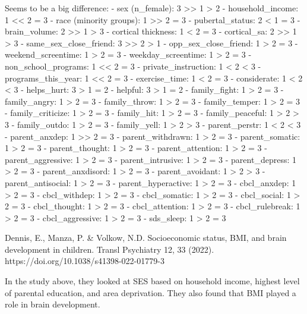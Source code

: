 \documentclass[
  letterpaper,
  DIV=11,
  numbers=noendperiod]{scrreprt}
\begin{document}
Seems to be a big difference: - sex (n\_female): 3
\textgreater\textgreater{} 1 \textgreater{} 2 - household\_income: 1
\textless\textless{} 2 = 3 - race (minority groups): 1
\textgreater\textgreater{} 2 = 3 - pubertal\_status: 2 \textless{} 1 = 3
- brain\_volume: 2 \textgreater\textgreater{} 1 \textgreater{} 3 -
cortical thickness: 1 \textless{} 2 = 3 - cortical\_sa: 2
\textgreater\textgreater{} 1 \textgreater{} 3 -
same\_sex\_close\_friend: 3 \textgreater\textgreater{} 2 \textgreater{}
1 - opp\_sex\_close\_friend: 1 \textgreater{} 2 = 3 -
weekend\_screentime: 1 \textgreater{} 2 = 3 - weekday\_screentime: 1
\textgreater{} 2 = 3 - non\_school\_programs: 1 \textless\textless{} 2 =
3 - private\_instruction: 1 \textless{} 2 \textless{} 3 -
programs\_this\_year: 1 \textless\textless{} 2 = 3 - exercise\_time: 1
\textless{} 2 = 3 - considerate: 1 \textless{} 2 \textless{} 3 -
helps\_hurt: 3 \textgreater{} 1 = 2 - helpful: 3 \textgreater{} 1 = 2 -
family\_fight: 1 \textgreater{} 2 = 3 - family\_angry: 1 \textgreater{}
2 = 3 - family\_throw: 1 \textgreater{} 2 = 3 - family\_temper: 1
\textgreater{} 2 = 3 - family\_criticize: 1 \textgreater{} 2 = 3 -
family\_hit: 1 \textgreater{} 2 = 3 - family\_peaceful: 1 \textgreater{}
2 \textgreater{} 3 - family\_outdo: 1 \textgreater{} 2 = 3 -
family\_yell: 1 \textgreater{} 2 \textgreater{} 3 - parent\_perstr: 1
\textless{} 2 \textless{} 3 - parent\_anxdep: 1
\textgreater\textgreater{} 2 = 3 - parent\_withdrawn: 1 \textgreater{} 2
= 3 - parent\_somatic: 1 \textgreater{} 2 = 3 - parent\_thought: 1
\textgreater{} 2 = 3 - parent\_attention: 1 \textgreater{} 2 = 3 -
parent\_aggressive: 1 \textgreater{} 2 = 3 - parent\_intrusive: 1
\textgreater{} 2 = 3 - parent\_depress: 1 \textgreater{} 2 = 3 -
parent\_anxdisord: 1 \textgreater{} 2 = 3 - parent\_avoidant: 1
\textgreater{} 2 \textgreater{} 3 - parent\_antisocial: 1 \textgreater{}
2 = 3 - parent\_hyperactive: 1 \textgreater{} 2 = 3 - cbcl\_anxdep: 1
\textgreater{} 2 = 3 - cbcl\_withdep: 1 \textgreater{} 2 = 3 -
cbcl\_somatic: 1 \textgreater{} 2 = 3 - cbcl\_social: 1 \textgreater{} 2
= 3 - cbcl\_thought: 1 \textgreater{} 2 = 3 - cbcl\_attention: 1
\textgreater{} 2 = 3 - cbcl\_rulebreak: 1 \textgreater{} 2 = 3 -
cbcl\_aggressive: 1 \textgreater{} 2 = 3 - sds\_sleep: 1 \textgreater{}
2 = 3

Dennis, E., Manza, P. \& Volkow, N.D. Socioeconomic status, BMI, and
brain development in children. Transl Psychiatry 12, 33 (2022).
https://doi.org/10.1038/s41398-022-01779-3

In the study above, they looked at SES based on household income,
highest level of parental education, and area deprivation. They also
found that BMI played a role in brain development.
\end{document}
